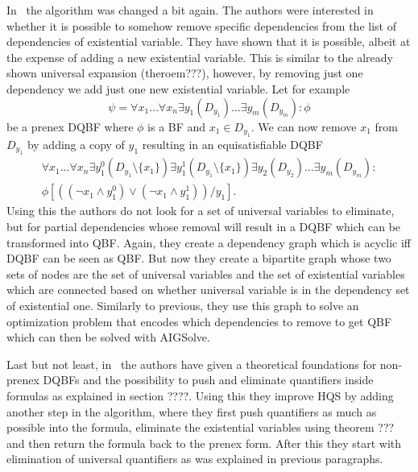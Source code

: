 \documentclass[
  digital, %
  twoside, %
  table,   %
  nolof,     %
  nolot,     %
]{fithesis3}
\theoremstyle{definition}
\theoremstyle{remark}
\begin{document}
In~\cite{HQSdependencyElimination} the algorithm was changed a bit again. The authors were interested in whether it is possible to somehow remove specific dependencies from the list of dependencies of existential variable. They have shown that it is possible, albeit at the expense of adding a new existential variable. This is similar to the already shown universal expansion (theroem???), however, by removing just one dependency we add just one new existential variable. Let for example
\[\psi = \forall x_1 \dots \forall x_n \exists y_1(D_{y_1}) \dots \exists y_m(D_{y_m}) \colon \phi\]
be a prenex DQBF where $\phi$ is a BF and $x_1 \in D_{y_1}$. We can now remove $x_1$ from $D_{y_1}$ by adding a copy of $y_1$ resulting in an equisatisfiable DQBF
\begin{multline*}
\forall x_1 \dots \forall x_n \exists y_1^0(D_{y_1} \setminus \{x_1\}) \exists y_1^1(D_{y_1} \setminus \{x_1\}) \exists y_2(D_{y_2})\dots \exists y_m(D_{y_m}) \colon \\
\phi\left[((\neg x_1 \land y_1^0) \lor (\neg x_1 \land y_1^1))/y_1\right].
\end{multline*}
Using this the authors do not look for a set of universal variables to eliminate, but for partial dependencies whose removal will result in a DQBF which can be transformed into QBF. Again, they create a dependency graph which is acyclic iff DQBF can be seen as QBF. But now they create a bipartite graph whose two sets of nodes are the set of universal variables and the set of existential variables which are connected based on whether universal variable is in the dependency set of existential one. Similarly to previous, they use this graph to solve an optimization problem that encodes which dependencies to remove to get QBF which can then be solved with AIGSolve.

Last but not least, in~\cite{HQSquantifierLocalization} the authors have given a theoretical foundations for non-prenex DQBFs and the possibility to push and eliminate quantifiers inside formulas as explained in section ????. Using this they improve HQS by adding another step in the algorithm, where they first push quantifiers as much as possible into the formula, eliminate the existential variables using theorem ??? and then return the formula back to the prenex form. After this they start with elimination of universal quantifiers as was explained in previous paragraphs.
\end{document}
